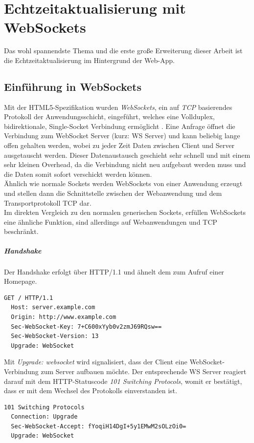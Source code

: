 \chapter{Echtzeitaktualisierung mit WebSockets}
Das wohl spannendste Thema und die erste große Erweiterung dieser Arbeit ist die Echtzeitaktualisierung im Hintergrund der Web-App.

\section{Einführung in WebSockets}
Mit der HTML5-Spezifikation wurden \emph{WebSockets}, ein auf \emph{TCP} basierendes Protokoll der Anwendungsschicht, eingeführt, welches eine Vollduplex, bidirektionale, Single-Socket Verbindung ermöglicht \cite[S. 7]{ws}. Eine Anfrage öffnet die Verbindung zum WebSocket Server (kurz: WS Server) und kann beliebig lange offen gehalten werden, wobei zu jeder Zeit Daten zwischen Client und Server ausgetauscht werden. Dieser Datenaustausch geschieht sehr schnell und mit einem sehr kleinen Overhead, da die Verbindung nicht neu aufgebaut werden muss und die Daten somit sofort verschickt werden können.\\
Ähnlich wie \glqq normale\grqq{} Sockets werden WebSockets von einer Anwendung erzeugt und stellen dann die Schnittstelle zwischen der Webanwendung und dem Transportprotokoll TCP dar.\\
Im direkten Vergleich zu den normalen generischen Sockets, erfüllen WebSockets eine ähnliche Funktion, sind allerdings auf Webanwendungen und TCP beschränkt. 

\paragraph{Handshake} 
Der Handshake erfolgt über HTTP/1.1 und ähnelt dem zum Aufruf einer Homepage.
\\
\begin{lstlisting}[captionpos=b, caption=HTTP Request des Clients {\cite[S. 6]{rfc6455:handshake}}]
  GET / HTTP/1.1
  Host: server.example.com
  Origin: http://www.example.com
  Sec-WebSocket-Key: 7+C600xYyb0v2zmJ69RQsw==
  Sec-WebSocket-Version: 13
  Upgrade: WebSocket
\end{lstlisting}

Mit \emph{Upgrade: websocket} wird signalisiert, dass der Client eine WebSocket-Verbindung zum Server aufbauen möchte. Der entsprechende WS Server reagiert darauf mit dem HTTP-Statuscode \emph{101 Switching Protocols}, womit er bestätigt, dass er mit dem Wechsel des Protokolls einverstanden ist.
\\
\begin{lstlisting}[captionpos=b, caption=HTTP Response des Servers {\cite[S. 8]{rfc6455:handshake}}]
  101 Switching Protocols
  Connection: Upgrade
  Sec-WebSocket-Accept: fYoqiH14DgI+5y1EMwM2sOLzOi0=
  Upgrade: WebSocket
\end{lstlisting}

